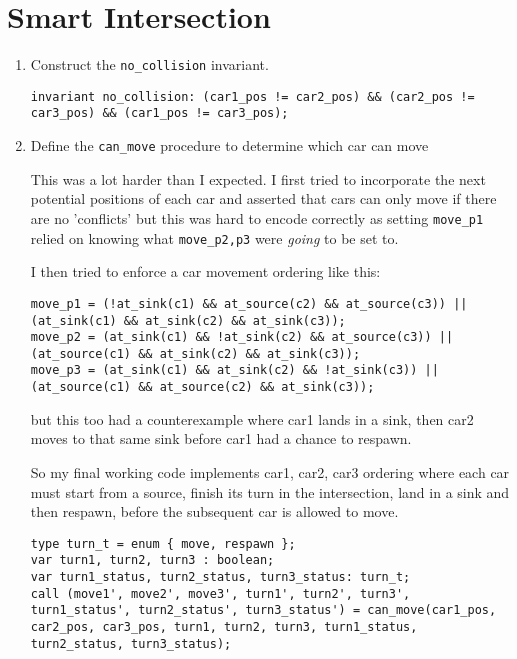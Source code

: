 \section{Smart Intersection}
\begin{enumerate}[label=(\alph*)]
  \item {\color{blue}Construct the \verb|no_collision| invariant.}

    \begin{verbatim}
invariant no_collision: (car1_pos != car2_pos) && (car2_pos != car3_pos) && (car1_pos != car3_pos);
    \end{verbatim}

  \item {\color{blue}Define the \verb|can_move| procedure to determine which car can move}

    This was a lot harder than I expected. I first tried to incorporate the next potential positions of each car and asserted that cars can only move if there are no 'conflicts' but this was hard to encode correctly as setting \verb|move_p1| relied on knowing what \verb|move_p2,p3| were \textit{going} to be set to.

    I then tried to enforce a car movement ordering like this:
    \begin{verbatim}
move_p1 = (!at_sink(c1) && at_source(c2) && at_source(c3)) || (at_sink(c1) && at_sink(c2) && at_sink(c3));
move_p2 = (at_sink(c1) && !at_sink(c2) && at_source(c3)) || (at_source(c1) && at_sink(c2) && at_sink(c3));
move_p3 = (at_sink(c1) && at_sink(c2) && !at_sink(c3)) || (at_source(c1) && at_source(c2) && at_sink(c3));
    \end{verbatim}
    but this too had a counterexample where car1 lands in a sink, then car2 moves to that same sink before car1 had a chance to respawn.

    So my final working code implements car1, car2, car3 ordering where each car must start from a source, finish its turn in the intersection, land in a sink and then respawn, before the subsequent car is allowed to move.

    \begin{verbatim}
type turn_t = enum { move, respawn };
var turn1, turn2, turn3 : boolean;
var turn1_status, turn2_status, turn3_status: turn_t;
call (move1', move2', move3', turn1', turn2', turn3', turn1_status', turn2_status', turn3_status') = can_move(car1_pos, car2_pos, car3_pos, turn1, turn2, turn3, turn1_status, turn2_status, turn3_status);


\end{verbatim}
\end{enumerate}
